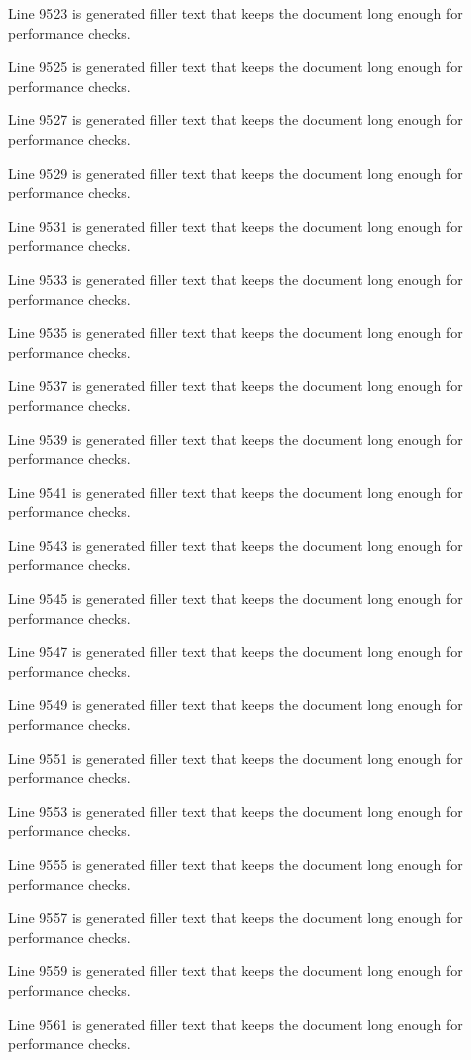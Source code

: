 Line 9523 is generated filler text that keeps the document long enough for performance checks.

Line 9525 is generated filler text that keeps the document long enough for performance checks.

Line 9527 is generated filler text that keeps the document long enough for performance checks.

Line 9529 is generated filler text that keeps the document long enough for performance checks.

Line 9531 is generated filler text that keeps the document long enough for performance checks.

Line 9533 is generated filler text that keeps the document long enough for performance checks.

Line 9535 is generated filler text that keeps the document long enough for performance checks.

Line 9537 is generated filler text that keeps the document long enough for performance checks.

Line 9539 is generated filler text that keeps the document long enough for performance checks.

Line 9541 is generated filler text that keeps the document long enough for performance checks.

Line 9543 is generated filler text that keeps the document long enough for performance checks.

Line 9545 is generated filler text that keeps the document long enough for performance checks.

Line 9547 is generated filler text that keeps the document long enough for performance checks.

Line 9549 is generated filler text that keeps the document long enough for performance checks.

Line 9551 is generated filler text that keeps the document long enough for performance checks.

Line 9553 is generated filler text that keeps the document long enough for performance checks.

Line 9555 is generated filler text that keeps the document long enough for performance checks.

Line 9557 is generated filler text that keeps the document long enough for performance checks.

Line 9559 is generated filler text that keeps the document long enough for performance checks.

Line 9561 is generated filler text that keeps the document long enough for performance checks.

